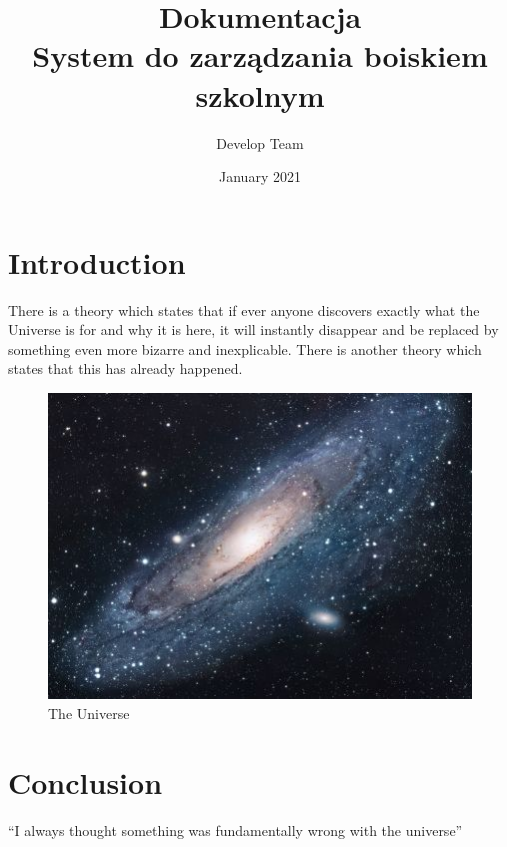 \documentclass[titlepage]{article}
\title{
  Dokumentacja \\
  System do zarządzania boiskiem szkolnym}
\date{January 2021}
\author{Develop Team}
\begin{document}
\maketitle

\section{Introduction}
There is a theory which states that if ever anyone discovers exactly what the Universe is for and why it is here, it will instantly disappear and be replaced by something even more bizarre and inexplicable.
There is another theory which states that this has already happened.

\begin{figure}[h!]
\centering
\includegraphics[scale=1.7]{universe}
\caption{The Universe}
\label{fig:universe}
\end{figure}

\section{Conclusion}
``I always thought something was fundamentally wrong with the universe'' \citep{adams1995hitchhiker}



\end{document}
